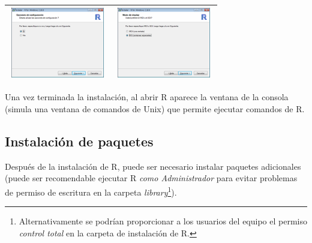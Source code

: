 \documentclass[
]{book}
\begin{document}
\begin{longtable}[]{@{}cc@{}}
\includegraphics[width=0.95\textwidth,height=\textheight]{images/image5.png} & \includegraphics[width=0.95\textwidth,height=\textheight]{images/image6.png}\tabularnewline
\bottomrule
\end{longtable}

Una vez terminada la instalación, al abrir R aparece la ventana de la consola (simula una ventana de comandos de Unix) que permite ejecutar comandos de R.

\hypertarget{instalaciuxf3n-de-paquetes}{%
\subsection{Instalación de paquetes}\label{instalaciuxf3n-de-paquetes}}

Después de la instalación de R, puede ser necesario instalar paquetes adicionales (puede ser recomendable ejecutar R \emph{como Administrador} para evitar problemas de permiso de escritura en la carpeta \emph{library}\footnote{Alternativamente se podrían proporcionar a los usuarios del equipo el permiso \emph{control total} en la carpeta de instalación de R.}).
\end{document}
